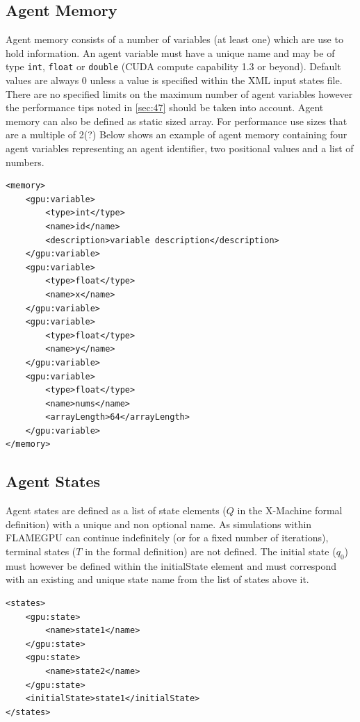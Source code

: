 \documentclass[11pt, a4paper, onecolumn, oneside]{report}
\begin{document}
\subsection{Agent Memory}
\label{sec:231}


Agent memory consists of a number of variables (at least one) which are use to hold information.
An agent variable must have a unique name and may be of type \texttt{int}, \texttt{float} or \texttt{double} (CUDA compute capability 1.3 or beyond).
Default values are always $0$ unless a value is specified within the XML input states file.
There are no specified limits on the maximum number of agent variables however the performance tips noted in \cref{sec:47} should be taken into account.
Agent memory can also be defined as static sized array. For performance use sizes that are a multiple of 2(?)
Below shows an example of agent memory containing four agent variables representing an agent identifier, two positional values and a list of numbers.

\begin{verbatim}
<memory>
    <gpu:variable>
        <type>int</type>
        <name>id</name>
        <description>variable description</description>
    </gpu:variable>
    <gpu:variable>
        <type>float</type>
        <name>x</name>
    </gpu:variable>
    <gpu:variable>
        <type>float</type>
        <name>y</name>
    </gpu:variable>
    <gpu:variable>
        <type>float</type>
        <name>nums</name>
        <arrayLength>64</arrayLength>
    </gpu:variable>
</memory>
\end{verbatim}


\subsection{Agent States}
\label{sec:232}

Agent states are defined as a list of state elements ($Q$ in the X-Machine formal definition) with a unique and non optional name.
As simulations within FLAMEGPU can continue indefinitely (or for a fixed number of iterations), terminal states ($T$ in the formal definition) are not defined.
The initial state ($q_{0}$) must however be defined within the initialState element and must correspond with an existing and unique state name from the list of states above it.

\begin{verbatim}
<states>
    <gpu:state>
        <name>state1</name>
    </gpu:state>
    <gpu:state>
        <name>state2</name>
    </gpu:state>
    <initialState>state1</initialState>
</states>
\end{verbatim}
\end{document}
